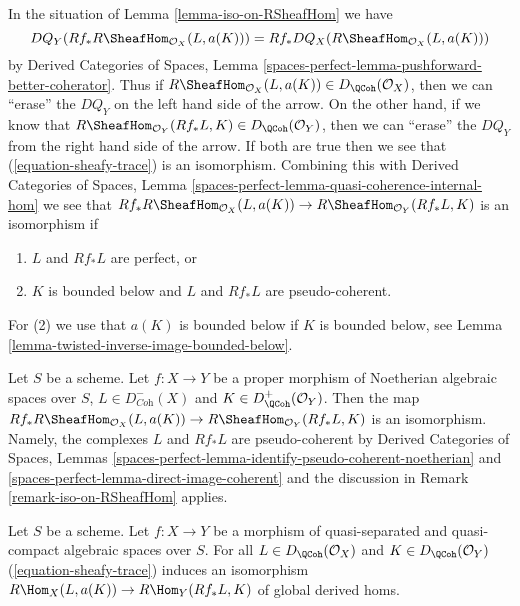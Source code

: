 \begin{remark}
\label{remark-iso-on-RSheafHom}
In the situation of Lemma \ref{lemma-iso-on-RSheafHom} we have
$$
DQ_Y(Rf_*R\SheafHom_{\mathcal{O}_X}(L, a(K))) =
Rf_* DQ_X(R\SheafHom_{\mathcal{O}_X}(L, a(K)))
$$
by Derived Categories of Spaces, Lemma
\ref{spaces-perfect-lemma-pushforward-better-coherator}.
Thus if $R\SheafHom_{\mathcal{O}_X}(L, a(K)) \in D_\QCoh(\mathcal{O}_X)$,
then we can ``erase'' the $DQ_Y$ on the left hand side of the arrow.
On the other hand, if we know that
$R\SheafHom_{\mathcal{O}_Y}(Rf_*L, K) \in D_\QCoh(\mathcal{O}_Y)$,
then we can ``erase'' the $DQ_Y$ from the right hand side of the arrow.
If both are true then we see that (\ref{equation-sheafy-trace})
is an isomorphism. Combining this with
Derived Categories of Spaces, Lemma
\ref{spaces-perfect-lemma-quasi-coherence-internal-hom}
we see that $Rf_*R\SheafHom_{\mathcal{O}_X}(L, a(K)) \to
R\SheafHom_{\mathcal{O}_Y}(Rf_*L, K)$ is an isomorphism if
\begin{enumerate}
\item $L$ and $Rf_*L$ are perfect, or
\item $K$ is bounded below and $L$ and $Rf_*L$ are pseudo-coherent.
\end{enumerate}
For (2) we use that $a(K)$ is bounded below if $K$
is bounded below, see Lemma \ref{lemma-twisted-inverse-image-bounded-below}.
\end{remark}

\begin{example}
\label{example-iso-on-RSheafHom-noetherian}
Let $S$ be a scheme.
Let $f : X \to Y$ be a proper morphism of Noetherian algebraic spaces
over $S$, $L \in D^-_{\textit{Coh}}(X)$ and $K \in D^+_{\QCoh}(\mathcal{O}_Y)$.
Then the map $Rf_*R\SheafHom_{\mathcal{O}_X}(L, a(K)) \to
R\SheafHom_{\mathcal{O}_Y}(Rf_*L, K)$ is an isomorphism.
Namely, the complexes $L$ and $Rf_*L$ are pseudo-coherent by
Derived Categories of Spaces, Lemmas
\ref{spaces-perfect-lemma-identify-pseudo-coherent-noetherian} and
\ref{spaces-perfect-lemma-direct-image-coherent}
and the discussion in Remark \ref{remark-iso-on-RSheafHom} applies.
\end{example}

\begin{lemma}
\label{lemma-iso-global-hom}
Let $S$ be a scheme.
Let $f : X \to Y$ be a morphism of quasi-separated and quasi-compact
algebraic spaces over $S$.
For all $L \in D_\QCoh(\mathcal{O}_X)$ and $K \in D_\QCoh(\mathcal{O}_Y)$
(\ref{equation-sheafy-trace}) induces an isomorphism
$R\Hom_X(L, a(K)) \to R\Hom_Y(Rf_*L, K)$ of global derived homs.
\end{lemma}

